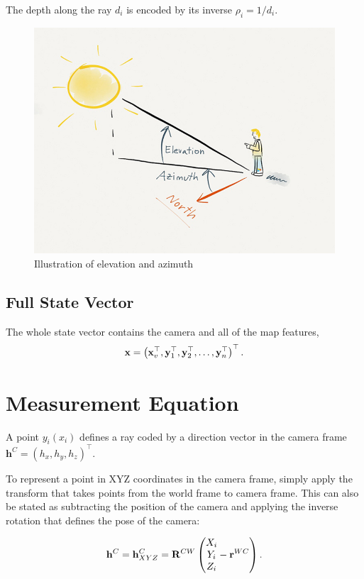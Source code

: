 \documentclass[twoside]{article}
\begin{document}
The depth along the ray $d_i$ is encoded by its inverse $\rho_i = 1/d_i$.
\begin{figure}[h]
\includegraphics[scale=0.3]{azimuth.jpg}
\centering
\caption{Illustration of elevation and azimuth}
\end{figure}

\subsection*{Full State Vector}
The whole state vector contains the camera and all of the map features,
\begin{equation}
{\bf x}=\left({\bf x}_v^\top, {\bf y}_1^\top, {\bf y}_2^\top, \ldots, {\bf y}_n^\top\right)^\top . 
\end{equation}

\section{Measurement Equation}
A point $y_i(x_i)$ defines a ray coded by a direction vector in the camera frame $\textbf{h}^C = (h_x, h_y, h_z) ^ \top$.

To represent a point in XYZ coordinates in the camera frame, simply apply the transform that takes points from the world frame to camera frame. This can also be stated as subtracting the position of the camera and applying the inverse rotation that defines the pose of the camera:

\begin{equation}
{\bf h}^C={\bf h}^C_{{XYZ}}={\bf R}^{CW}\left(\begin{matrix}X_i \cr Y_i \cr Z_i\end{matrix}-{\bf r}^{WC}\right) .
\end{equation}
\end{document}
